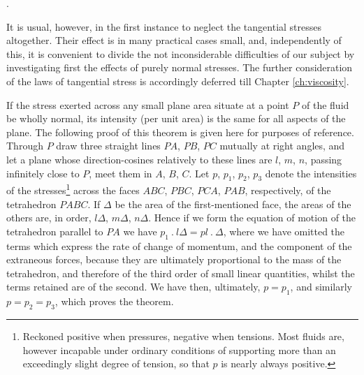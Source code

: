 \documentclass[twoside, openany]{book}
\newcommand{\edot}{\>.\>}
\newcounter{article}
\newcounter{lastarticle}
\newcommand{\article}[1]{
  \stepcounter{article}
  \textbf{\thearticle}.
  \markright{#1} %
}
\numberwithin{equation}{article} %
\begin{document}
\article{a2}
It is usual, however, in the first instance to neglect the tangential stresses altogether. Their effect is in many practical cases small, and, independently of this, it is convenient to divide the not inconsiderable difficulties of our subject by investigating first the effects of purely normal stresses. The further consideration of the laws of tangential stress is accordingly deferred till Chapter \ref{ch:viscosity}.

If the stress exerted across any small plane area situate at a point $P$ of the fluid be wholly normal, its intensity (per unit area) is the same for all aspects of the plane. The following proof of this theorem is given here for purposes of reference. Through $P$ draw three straight lines $PA$, $PB$, $PC$ mutually at right angles, and let a plane whose direction-cosines relatively to these lines are $l$, $m$, $n$, passing infinitely close to $P$, meet them in $A$, $B$, $C$. Let $p$, $p_1$, $p_2$, $p_3$ denote the intensities of the stresses\footnote{Reckoned positive when pressures, negative when tensions. Most fluids are, however incapable under ordinary conditions of supporting more than an exceedingly slight degree of tension, so that $p$ is nearly always positive.} across the faces $ABC$, $PBC$, $PCA$, $PAB$, respectively, of the tetrahedron $PABC$. If $\Delta$ be the area of the first-mentioned face, the areas of the others are, in order, $l\Delta$, $m\Delta$, $n\Delta$. Hence if we form the equation of motion of the tetrahedron parallel to $PA$ we have $p_1 \edot l\Delta = pl \edot \Delta$, where we have omitted the terms which express the rate of change of momentum, and the component of the extraneous forces, because they are ultimately proportional to the mass of the tetrahedron, and therefore of the third order of small linear quantities, whilst the terms retained are of the second. We have then, ultimately, $p=p_1$, and similarly $p=p_2=p_3$, which proves the theorem.

\setcounter{lastarticle}{\thearticle}

\end{document}
